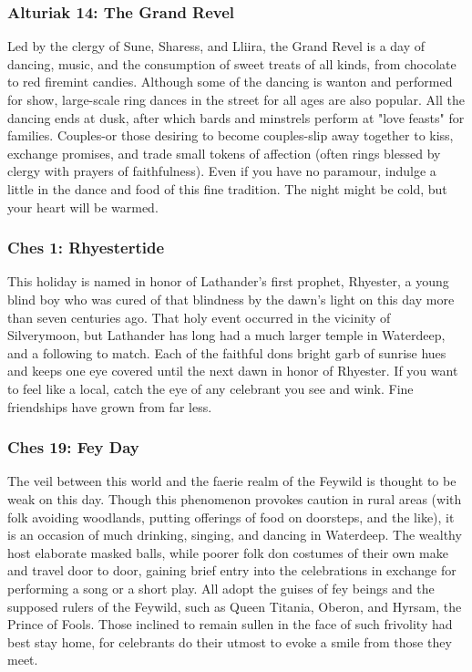 \documentclass[10pt,a4paper,twoside,twocolumn,openany,nodeprecatedcode]{dndbook}
\begin{document}
\subsubsection{Alturiak 14: The Grand Revel}
Led by the clergy of Sune, Sharess, and Lliira, the Grand Revel is a day of dancing, music, and the consumption of sweet treats of all kinds, from chocolate to red firemint candies. Although some of the dancing is wanton and performed for show, large-scale ring dances in the street for all ages are also popular. All the dancing ends at dusk, after which bards and minstrels perform at "love feasts" for families. Couples-or those desiring to become couples-slip away together to kiss, exchange promises, and trade small tokens of affection (often rings blessed by clergy with prayers of faithfulness). Even if you have no paramour, indulge a little in the dance and food of this fine tradition. The night might be cold, but your heart will be warmed.
\subsubsection{Ches 1: Rhyestertide}
This holiday is named in honor of Lathander's first prophet, Rhyester, a young blind boy who was cured of that blindness by the dawn's light on this day more than seven centuries ago. That holy event occurred in the vicinity of Silverymoon, but Lathander has long had a much larger temple in Waterdeep, and a following to match. Each of the faithful dons bright garb of sunrise hues and keeps one eye covered until the next dawn in honor of Rhyester. If you want to feel like a local, catch the eye of any celebrant you see and wink. Fine friendships have grown from far less.
\subsubsection{Ches 19: Fey Day}
The veil between this world and the faerie realm of the Feywild is thought to be weak on this day. Though this phenomenon provokes caution in rural areas (with folk avoiding woodlands, putting offerings of food on doorsteps, and the like), it is an occasion of much drinking, singing, and dancing in Waterdeep. The wealthy host elaborate masked balls, while poorer folk don costumes of their own make and travel door to door, gaining brief entry into the celebrations in exchange for performing a song or a short play. All adopt the guises of fey beings and the supposed rulers of the Feywild, such as Queen Titania, Oberon, and Hyrsam, the Prince of Fools. Those inclined to remain sullen in the face of such frivolity had best stay home, for celebrants do their utmost to evoke a smile from those they meet.
\end{document}
